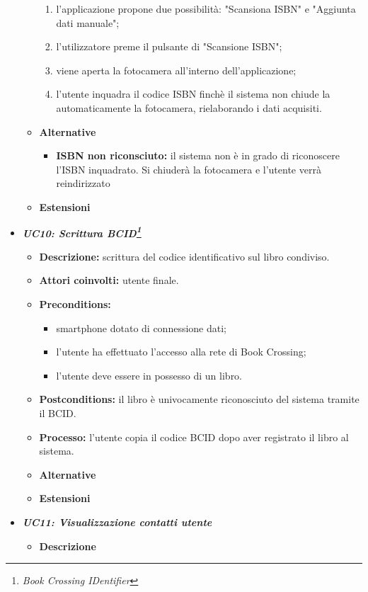 \begin{itemize}
\begin{itemize}
\begin{enumerate}
			\item l’applicazione propone due possibilità: "Scansiona ISBN" e "Aggiunta dati manuale";
			\item l'utilizzatore preme il pulsante di "Scansione ISBN";
			\item viene aperta la fotocamera all'interno dell'applicazione;
			\item l'utente inquadra il codice ISBN finchè il sistema non chiude la automaticamente la fotocamera, rielaborando i dati acquisiti.
		\end{enumerate}
		\item \textbf{Alternative}
		\begin{itemize}
			\item \textbf{ISBN non riconsciuto:} il sistema non è in grado di riconoscere l'ISBN inquadrato. Si chiuderà la fotocamera e l'utente verrà reindirizzato 
		\end{itemize}
		\item \textbf{Estensioni}
	\end{itemize}
	\item \textbf{\textit{UC10: Scrittura BCID\footnote{\textit{Book Crossing IDentifier}}}}
	\begin{itemize}
		\item \textbf{Descrizione:} scrittura del codice identificativo sul libro condiviso.
		\item \textbf{Attori coinvolti:} utente finale.
		\item \textbf{Preconditions:}
		\begin{itemize}
			\item smartphone dotato di connessione dati;
			\item l’utente ha effettuato l’accesso alla rete di Book Crossing;
			\item l'utente deve essere in possesso di un libro.
		\end{itemize}
		\item \textbf{Postconditions:} il libro è univocamente riconosciuto del sistema tramite il BCID.
		\item \textbf{Processo:} l'utente copia il codice BCID dopo aver registrato il libro al sistema.
		\item \textbf{Alternative}
		\item \textbf{Estensioni}
	\end{itemize}
	\item \textbf{\textit{UC11: Visualizzazione contatti utente}}
	\begin{itemize}
		\item \textbf{Descrizione}

\end{itemize}
\end{itemize}
